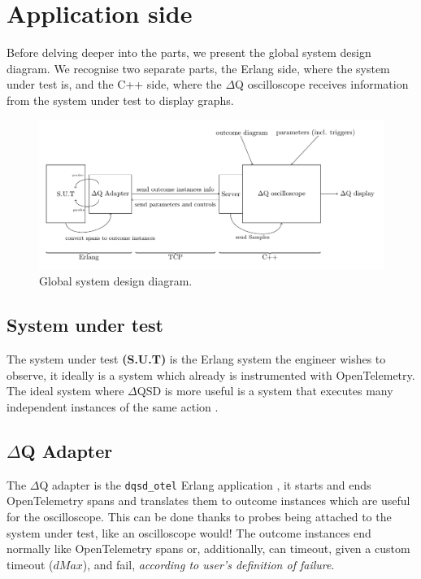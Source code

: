 \section{Application side} 
    
    Before delving deeper into the parts, we present the global system design diagram. We recognise two separate parts, the Erlang side, where the system under test is, and the C++ side, where the $\Delta$Q oscilloscope receives information from the system under test to display graphs.

    \begin{figure}[H]
        \begin{center}
            \includegraphics[width=\textwidth]{tikz/sut-stub-osc.pdf}
        \end{center}
        \caption{Global system design diagram.}
    \end{figure}


    \subsection{System under test} The system under test \textbf{(S.U.T)} is the Erlang system the engineer wishes to observe, it ideally is a system which already is instrumented with OpenTelemetry. The ideal system where $\Delta$QSD is more useful is a system that executes many independent instances of the same action \cite{dq-tut}. 
    
    \subsection{$\Delta$Q Adapter} The $\Delta$Q adapter is the \texttt{dqsd\_otel} Erlang application \cite{wrapper}, it starts and ends OpenTelemetry spans and translates them to outcome instances which are useful for the oscilloscope. This can be done thanks to probes being attached to the system under test, like an oscilloscope would! The outcome instances end normally like OpenTelemetry spans or, additionally, can timeout, given a custom timeout ($dMax$), and fail, \textit{according to user's definition of failure}. 
    
